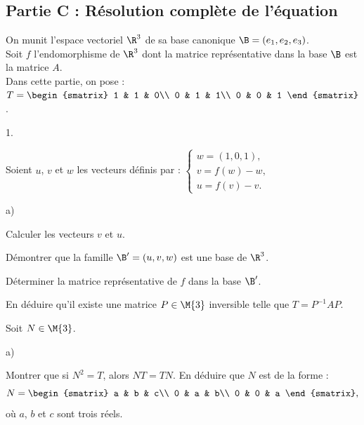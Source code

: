 \subsection*{Partie C : Résolution complète de l'équation}
\noindent
On munit l'espace vectoriel $\R^3$ de sa base canonique 
$\B=(e_1,e_2,e_3)$.\\
Soit $f$ l'endomorphisme de $\R^3$ dont la matrice représentative dans 
la base $\B$ est la matrice $A$.\\
Dans cette partie, on pose : $T=\begin{smatrix}
  1 & 1 & 0\\ 0 & 1 & 1\\ 0 & 0 & 1
\end{smatrix}$.
\begin{noliste}{1.}
  \setcounter{enumi}{7}
\item Soient $u$, $v$ et $w$ les vecteurs définis par : $\left\{ 
    \begin{array}{l}
      w=(1,0,1),\\
      v=f(w)-w,\\
      u=f(v)-v.
    \end{array}\right.$
  \begin{noliste}{a)}
  \item Calculer les vecteurs $v$ et $u$.
    
    
    
	
	
	
  \item Démontrer que la famille $\B'=(u,v,w)$ est une base de $\R^3$.
    
    
    
  \item Déterminer la matrice représentative de $f$ dans la base
    $\B'$.
    
    
    
  \item En déduire qu'il existe une matrice $P\in\M{3}$ 
    inversible telle que $T=P^{-1}AP$.
    
    
  \end{noliste}
  
\item Soit $N\in\M{3}$.
  \begin{noliste}{a)}
  \item Montrer que si $N^2=T$, alors $NT=TN$. En déduire que $N$ 
    est de la forme :
    \[
    N=
    \begin{smatrix} 
      a & b & c\\ 
      0 & a & b\\ 
      0 & 0 & a
    \end{smatrix},
    \]
    où $a$, $b$ et $c$ sont trois réels.
    

\end{noliste}
\end{noliste}
